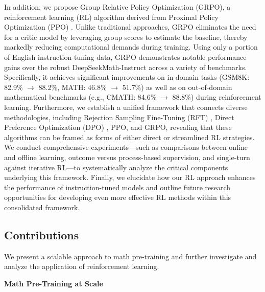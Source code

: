 In addition, we propose Group Relative Policy Optimization (GRPO), a reinforcement learning (RL) algorithm derived from Proximal Policy Optimization (PPO) \citep{schulman2017proximal}. Unlike traditional approaches, GRPO eliminates the need for a critic model by leveraging group scores to estimate the baseline, thereby markedly reducing computational demands during training. Using only a portion of English instruction-tuning data, GRPO demonstrates notable performance gains over the robust DeepSeekMath-Instruct across a variety of benchmarks. Specifically, it achieves significant improvements on in-domain tasks (GSM8K: 82.9\% $\rightarrow$ 88.2\%, MATH: 46.8\% $\rightarrow$ 51.7\%) as well as on out-of-domain mathematical benchmarks (e.g., CMATH: 84.6\% $\rightarrow$ 88.8\%) during reinforcement learning. Furthermore, we establish a unified framework that connects diverse methodologies, including Rejection Sampling Fine-Tuning (RFT) \citep{yuan2023scaling}, Direct Preference Optimization (DPO) \citep{dpo}, PPO, and GRPO, revealing that these algorithms can be framed as forms of either direct or streamlined RL strategies. We conduct comprehensive experiments—such as comparisons between online and offline learning, outcome versus process-based supervision, and single-turn against iterative RL—to systematically analyze the critical components underlying this framework. Finally, we elucidate how our RL approach enhances the performance of instruction-tuned models and outline future research opportunities for developing even more effective RL methods within this consolidated framework.

\subsection{Contributions}
We present a scalable approach to math pre-training and further investigate and analyze the application of reinforcement learning.

\textbf{Math Pre-Training at Scale}

